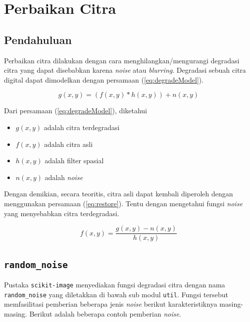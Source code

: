 \chapter{Perbaikan Citra}
\section{Pendahuluan}

Perbaikan citra dilakukan dengan cara menghilangkan/mengurangi degradasi citra yang dapat disebabkan karena \textit{noise} atau \textit{blurring}. Degradasi sebuah citra digital dapat dimodelkan dengan persamaan (\ref{eq:degradeModel})\cite{Gonzalez}.

\begin{equation}
g(x,y)=\left(f(x,y)*h(x,y)\right)+n(x,y)
\label{eq:degradeModel}
\end{equation}
 
 Dari persamaan (\ref{eq:degradeModel}), diketahui
 \begin{itemize}
   \item $g(x,y)$ adalah citra terdegradasi
   \item $f(x,y)$ adalah citra asli
   \item $h(x,y)$ adalah filter spasial
   \item $n(x,y)$ adalah \textit{noise}
 \end{itemize}
 Dengan demikian, secara teoritis, citra asli dapat kembali diperoleh dengan menggunakan persamaan (\ref{eq:restore}). Tentu dengan mengetahui fungsi \textit{noise} yang menyebabkan citra terdegradasi.
 
 \begin{equation}
   f(x,y)=\frac{g(x,y)-n(x,y)}{h(x,y)}
   \label{eq:restore}
 \end{equation}
 
 \section{\texttt{random\_noise}}
 Pustaka \texttt{scikit-image} menyediakan fungsi degradasi citra dengan nama \texttt{random\_noise} yang diletakkan di bawah sub modul \texttt{util}. Fungsi tersebut memfasilitasi pemberian beberapa jenis \textit{noise} berikut karakteristiknya masing-masing. Berikut adalah beberapa contoh pemberian \textit{noise}. 
 
